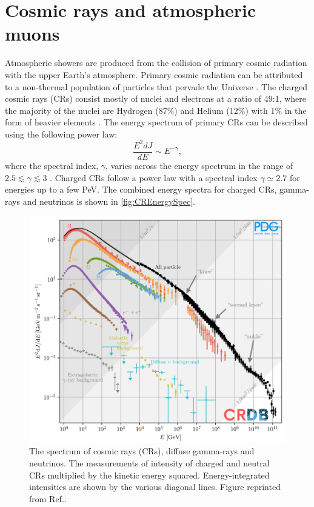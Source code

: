 \section{Cosmic rays and atmospheric muons}\label{sec:Muons/CosmicRays}
Atmospheric showers are produced from the collision of primary cosmic radiation with the upper Earth's atmosphere. Primary cosmic radiation can be attributed to a non-thermal population of particles that pervade the Universe \cite{ParticleDataGroup:2024cfk}. The charged cosmic rays (CRs) consist mostly of nuclei and electrons at a ratio of 49:1, where the majority of the nuclei are Hydrogen (87\%) and Helium (12\%) with 1\% in the form of heavier elements \cite{Longair_2011}. The energy spectrum of primary CRs can be described using the following power law:
\begin{equation}\label{eqn:CREnergy}
    \frac{E^2dJ}{dE}\sim E^{-\gamma},
\end{equation}
where the spectral index, $\gamma$, varies across the energy spectrum in the range of $2.5\lesssim\gamma\lesssim3$ \cite{ParticleDataGroup:2024cfk}. Charged CRs follow a power law with a spectral index $\gamma\simeq2.7$ for energies up to a few PeV. The combined energy spectra for charged CRs, gamma-rays and neutrinos is shown in \autoref{fig:CREnergySpec}.
\begin{figure}[ht!]
    \centering
    \includegraphics[width=0.7\linewidth]{figures/Muons/CosmicRaySpectra.png}
    \caption{The spectrum of cosmic rays (CRs), diffuse gamma-rays and neutrinos. The measurements of intensity of charged and neutral CRs multiplied by the kinetic energy squared. Energy-integrated intensities are shown by the various diagonal lines. Figure reprinted from Ref.\cite{ParticleDataGroup:2024cfk}.}
    \label{fig:CREnergySpec}
\end{figure}
